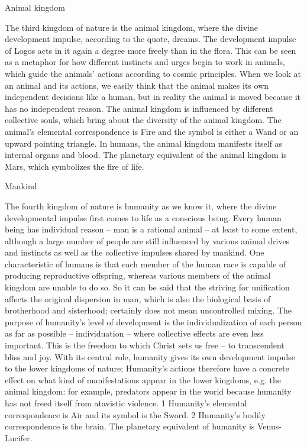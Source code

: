 \begin{footnotesize}
\begin{sffamily}
Animal kingdom

The third kingdom of nature is the animal kingdom, where the divine development impulse, according to the quote, dreams. The development impulse of Logos acts in it again a degree more freely than in the flora. This can be seen as a metaphor for how different instincts and urges begin to work in animals, which guide the animals' actions according to cosmic principles. When we look at an animal and its actions, we easily think that the animal makes its own independent decisions like a human, but in reality the animal is moved because it has no independent reason. The animal kingdom is influenced by different collective souls, which bring about the diversity of the animal kingdom. The animal's elemental correspondence is Fire and the symbol is either a Wand or an upward pointing triangle. In humans, the animal kingdom manifests itself as internal organs and blood. The planetary equivalent of the animal kingdom is Mars, which symbolizes the fire of life.

Mankind

The fourth kingdom of nature is humanity as we know it, where the divine developmental impulse first comes to life as a conscious being. Every human being has individual reason – man is a rational animal – at least to some extent, although a large number of people are still influenced by various animal drives and instincts as well as the collective impulses shared by mankind. One characteristic of humans is that each member of the human race is capable of producing reproductive offspring, whereas various members of the animal kingdom are unable to do so. So it can be said that the striving for unification affects the original dispersion in man, which is also the biological basis of brotherhood and sisterhood; certainly does not mean uncontrolled mixing. The purpose of humanity's level of development is the individualization of each person as far as possible – individuation – where collective effects are even less important. This is the freedom to which Christ sets us free – to transcendent bliss and joy. With its central role, humanity gives its own development impulse to the lower kingdoms of nature; Humanity's actions therefore have a concrete effect on what kind of manifestations appear in the lower kingdoms, e.g. the animal kingdom: for example, predators appear in the world because humanity has not freed itself from atavistic violence. 1 Humanity's elemental correspondence is Air and its symbol is the Sword. 2 Humanity's bodily correspondence is the brain. The planetary equivalent of humanity is Venus-Lucifer.


\end{sffamily}
\end{footnotesize}
